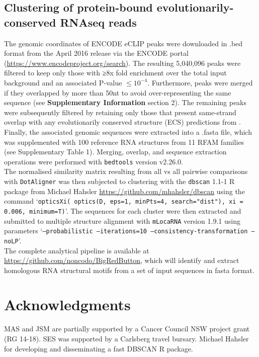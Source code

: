 \documentclass[a4paper,11pt]{article}
\newcommand\dotaligner{\texttt{DotAligner}}
\begin{document}
\subsection*{ Clustering of protein-bound evolutionarily-conserved RNAseq reads }

The genomic coordinates of ENCODE eCLIP peaks were downloaded in .bed format from the April 2016 release via the ENCODE portal (\url{https://www.encodeproject.org/search}). The resulting 5,040,096 peaks 
were filtered to keep only those with ≥8x fold enrichment over the total input background and an associated P-value  $\leq10^{-4}$. Furthermore, peaks were merged if they overlapped by more than 50nt to avoid over-representing the same sequence (see \textbf{Supplementary Information }section 2). The remaining peaks were subsequently filtered by 
retaining only those that present same-strand overlap with any evolutionarily conserved structure (ECS) predictions from \cite{smith2013widespread}. Finally, the associated genomic sequences were extracted into a .fasta file, which was supplemented with 100 reference RNA structures from 11 RFAM families (see Supplementary Table 1). 
Merging, overlap, and sequence extraction operations were performed with \texttt{bedtools} version v2.26.0. \\

The normalised similarity matrix resulting from all vs all pairwise comparisons with \dotaligner{} was then 
subjected to clustering with the \texttt{dbscan} 1.1-1 R package from Michael Hahsler
 \url{https://github.com/mhahsler/dbscan} using the command `\texttt{opticsXi( optics(D, eps=1, minPts=4, search="dist"), xi = 0.006, minimum=T)}'. The sequences for each cluster were then extracted and submitted to multiple structure alignment with \texttt{mLocaRNA} version 1.9.1 using parameters  `\texttt{--probabilistic --iterations=10  --consistency-transformation --noLP}'.\\
 
The complete analytical pipeline is available at \url{https://github.com/noncodo/BigRedButton},
which will identify and extract homologous RNA structural motifs from a set of 
input sequences in fasta format. \\

\section*{ Acknowledgments }
MAS and JSM are partially supported  by a Cancer Council NSW project grant (RG 14-18). 
SES was supported by a Carlsberg travel bursary. 
Michael Hahsler for developing and disseminating a fast DBSCAN R package.
\end{document}
